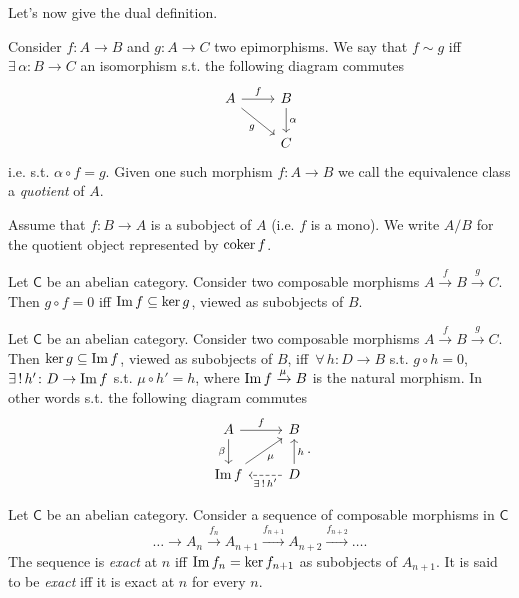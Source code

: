 Let's now give the dual definition.
\begin{defn}[Quotient]
	Consider $f\colon A \to B$ and $g\colon A \to C$ two epimorphisms.
	We say that $f \sim g$ iff $\exists\, \alpha\colon B \to C$ an isomorphism s.t. the following diagram commutes
	\begin{equation}
	\begin{tikzcd}
		A \arrow[r, "f", rightarrow] \arrow[rd, "g"', rightarrow] &
		B \arrow[d, "\alpha", rightarrow] \\
		& C
	\end{tikzcd}
	\end{equation} 
	i.e. s.t. $\alpha \circ f = g$.
	Given one such morphism $f\colon A \to B$ we call the equivalence class a {\em quotient} of $A$.
\end{defn}
\begin{rem}[notation]
	Assume that $f\colon B \to A$ is a subobject of $A$ (i.e. $f$ is a mono).
	We write $A/B$ for the quotient object represented by $\operatorname{coker} f$.
\end{rem}

\begin{lem}
	Let $\mathsf{C}$ be an abelian category.
	Consider two composable morphisms $A \xrightarrow{f} B \xrightarrow{g} C$.
	Then $g \circ f = 0$ iff $\operatorname{Im} f \subseteq \ker g$, viewed as subobjects of $B$.
\end{lem} 

\begin{lem}
	Let $\mathsf{C}$ be an abelian category.
	Consider two composable morphisms $A \xrightarrow{f} B \xrightarrow{g} C$.
	Then $\ker g \subseteq \operatorname{Im} f$, viewed as subobjects of $B$, iff $\,\forall\, h\colon D \to B$ s.t.
	$g \circ h = 0$, $\exists\, !\, h'\colon D \to \operatorname{Im} f$ s.t. $\mu \circ h' = h$, where $\operatorname{Im} f \xrightarrow{\mu} B$ is the natural morphism.
	In other words s.t. the following diagram commutes
	\begin{equation}
	\begin{tikzcd}
		A \arrow[r, "f", rightarrow] \arrow[d, "\beta"', rightarrow] &
		B\\
		\Ima f \arrow[ur, "\mu"', rightarrow] &
		D \arrow[u, "h"', rightarrow] \arrow[l, "\exists\, !\, h'", dashrightarrow] 
	\end{tikzcd}
	.\end{equation} 
\end{lem} 

\begin{defn}
	Let $\mathsf{C}$ be an abelian category.
	Consider a sequence of composable morphisms in $\mathsf{C}$
	\begin{equation}
	\ldots \to A_n \xrightarrow{f_n} 
	A_{n+1}  \xrightarrow{f_{n + 1}} 
	A_{n+2} \xrightarrow{f_{n + 2}} \ldots
	.\end{equation} 
	The sequence is {\em exact} at $n$ iff
	$\operatorname{Im} f_n = \ker f_{n+1}$ as subobjects of $A_{n + 1}$.
	It is said to be {\em exact} iff it is exact at $n$ for every $n$.
\end{defn}


